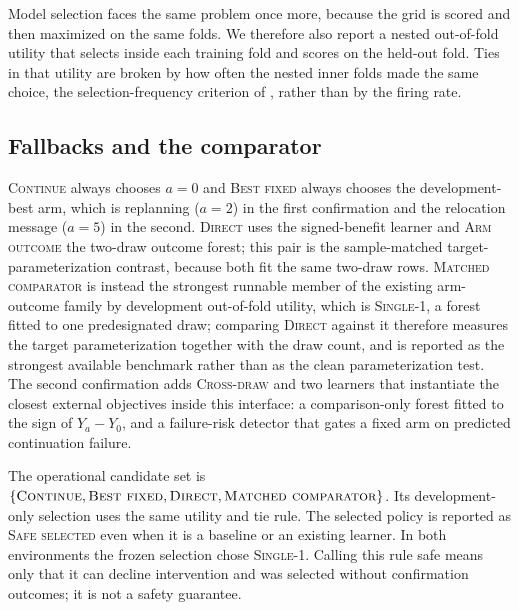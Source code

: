 \documentclass{article}
\begin{document}
Model selection faces the same problem once more, because the grid is scored and then maximized on the same folds. We therefore also report a nested out-of-fold utility that selects inside each training fold and scores on the held-out fold. Ties in that utility are broken by how often the nested inner folds made the same choice, the selection-frequency criterion of \citet{meinshausen2010stability}, rather than by the firing rate.

\subsection{Fallbacks and the comparator}

\textsc{Continue} always chooses $a=0$ and \textsc{Best fixed} always chooses the development-best arm, which is replanning ($a=2$) in the first confirmation and the relocation message ($a=5$) in the second. \textsc{Direct} uses the signed-benefit learner and \textsc{Arm outcome} the two-draw outcome forest; this pair is the sample-matched target-parameterization contrast, because both fit the same two-draw rows. \textsc{Matched comparator} is instead the strongest runnable member of the existing arm-outcome family by development out-of-fold utility, which is \textsc{Single-1}, a forest fitted to one predesignated draw; comparing \textsc{Direct} against it therefore measures the target parameterization together with the draw count, and is reported as the strongest available benchmark rather than as the clean parameterization test. The second confirmation adds \textsc{Cross-draw} and two learners that instantiate the closest external objectives inside this interface: a comparison-only forest fitted to the sign of $Y_a-Y_0$, and a failure-risk detector that gates a fixed arm on predicted continuation failure.

The operational candidate set is $\{\textsc{Continue},\textsc{Best fixed},\textsc{Direct},\textsc{Matched comparator}\}$. Its development-only selection uses the same utility and tie rule. The selected policy is reported as \textsc{Safe selected} even when it is a baseline or an existing learner. In both environments the frozen selection chose \textsc{Single-1}. Calling this rule safe means only that it can decline intervention and was selected without confirmation outcomes; it is not a safety guarantee.
\end{document}
